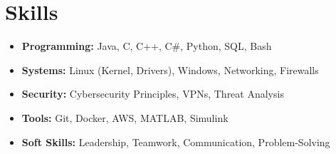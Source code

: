 \section{Skills}
\begin{itemize}
    \item \textbf{Programming:} Java, C, C++, C#, Python, SQL, Bash
    \item \textbf{Systems:} Linux (Kernel, Drivers), Windows, Networking, Firewalls
    \item \textbf{Security:} Cybersecurity Principles, VPNs, Threat Analysis
    \item \textbf{Tools:} Git, Docker, AWS, MATLAB, Simulink
    \item \textbf{Soft Skills:} Leadership, Teamwork, Communication, Problem-Solving
\end{itemize}
